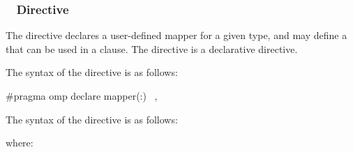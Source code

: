 \subsubsection{~ Directive}
\label{subsubsec:declare mapper Directive}

\summary

The  directive declares a user-defined mapper for a given
type, and may define a  that can be used in a 
clause. The  directive is a declarative directive.

\syntax
\begin{ccppspecific}
The syntax of the  directive is as follows:

\begin{ompcPragma}
#pragma omp declare mapper(\plc{[mapper-identifier}:\plc{]type var}) \
            \plc{[clause[ [},\plc{] clause] ... ] new-line}
\end{ompcPragma}

\end{ccppspecific}

\begin{fortranspecific}
The syntax of the  directive is as follows:

\end{fortranspecific}

where:

